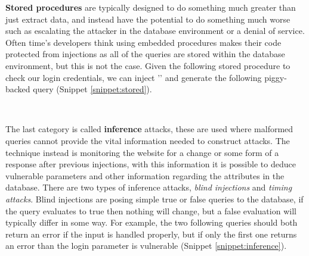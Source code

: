 \textbf{Stored procedures} are typically designed to do something much greater than just extract data, and instead have the potential to do something much worse such as escalating the attacker in the database environment or a denial of service.  Often time’s developers think using embedded procedures makes their code protected from injections as all of the queries are stored within the database environment, but this is not the case. Given the following stored procedure to check our login credentials, we can inject '' and generate the following piggy-backed query (Snippet \ref{snippet:stored}).

\begin{codesnippet}
	\vspace{0.25in}
	\noindent
	\\
	\label{snippet:stored}
	\vspace{0.25in}
\end{codesnippet}

The last category is called \textbf{inference} attacks, these are used where malformed queries cannot provide the vital information needed to construct attacks.  The technique instead is monitoring the website for a change or some form of a response after previous injections, with this information it is possible to deduce vulnerable parameters and other information regarding the attributes in the database.  There are two types of inference attacks, \emph{blind injections} and \emph{timing attacks}. Blind injections are posing simple true or false queries to the database, if the query evaluates to true then nothing will change, but a false evaluation will typically differ in some way.  For example, the two following queries should both return an error if the input is handled properly, but if only the first one returns an error than the login parameter is vulnerable (Snippet \ref{snippet:inference}).

